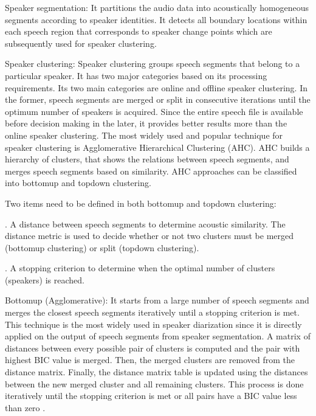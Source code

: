 \documentclass[letterpaper,10pt,english]{jupyterBook}
\begin{document}
\sphinxAtStartPar
Speaker segmentation: It partitions the audio data into acoustically
homogeneous segments according to speaker identities. It detects all
boundary locations within each speech region that corresponds to speaker
change points which are subsequently used for speaker clustering.

\sphinxAtStartPar
Speaker clustering: Speaker clustering groups speech segments that
belong to a particular speaker. It has two major categories based on its
processing requirements. Its two main categories are online and offline
speaker clustering. In the former, speech segments are merged or split
in consecutive iterations until the optimum number of speakers is
acquired. Since the entire speech file is available before decision
making in the later, it provides better results more than the online
speaker clustering. The most widely used and popular technique for
speaker clustering is Agglomerative Hierarchical Clustering (AHC). AHC
builds a hierarchy of clusters, that shows the relations between speech
segments, and merges speech segments based on similarity. AHC approaches
can be classified into bottom\sphinxhyphen{}up and top\sphinxhyphen{}down clustering.

\sphinxAtStartPar
Two items need to be defined in both bottom\sphinxhyphen{}up and top\sphinxhyphen{}down clustering:

. A distance between speech segments to determine acoustic similarity.
The distance metric is used to decide whether or not two clusters must
be merged (bottom\sphinxhyphen{}up clustering) or split (top\sphinxhyphen{}down clustering).

. A stopping criterion to determine when the optimal number of
clusters (speakers) is reached.

\sphinxAtStartPar
Bottom\sphinxhyphen{}up (Agglomerative): It starts from a large number of speech
segments and merges the closest speech segments iteratively until a
stopping criterion is met. This technique is the most widely used in
speaker diarization since it is directly applied on the output of speech
segments from speaker segmentation. A matrix of distances between every
possible pair of clusters is computed and the pair with highest BIC
value is merged. Then, the merged clusters are removed from the distance
matrix. Finally, the distance matrix table is updated using the
distances between the new merged cluster and all remaining clusters.
This process is done iteratively until the stopping criterion is met or
all pairs have a BIC value less than zero .
\end{document}
